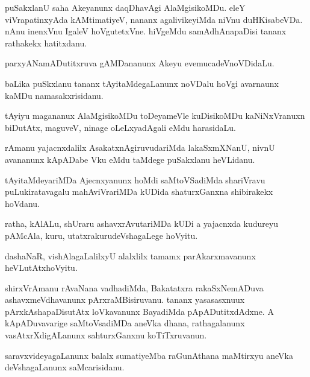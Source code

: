 \documentclass{article}
\begin{document}
\begin{mn}%
puSakxlanU saha Akeyanunx daqDhavAgi AlaMgisikoMDu. eleY viVrapatinxyAda kAMtimatiyeV, nananx
agalivikeyiMda niVnu duHKisabeVDa. nAnu inenxVnu IgaleV hoVgutetxVne. hiVgeMdu 
samAdhAnapaDisi tananx rathakekx hatitxdanu.
\end{mn}

\begin{mn}%
parxyANamADutitxruva gAMDananunx Akeyu evemucadeVnoVDidaLu.
\end{mn}

\begin{mn}%
baLika puSkxlanu tananx tAyitaMdegaLanunx noVDalu hoVgi avarnaunx kaMDu namasakxrisidanu.
\end{mn}

\begin{mn}%
tAyiyu magananux AlaMgisikoMDu toDeyameVle kuDisikoMDu kaNiNxVranuxn biDutAtx, maguveV, 
ninage oLeLxyadAgali eMdu harasidaLu.
\end{mn}

\begin{mn}%
rAmanu yajacnxdalilx AsakatxnAgiruvudariMda lakaSxmXNanU, nivnU avananunx kApADabe Vku 
eMdu taMdege puSakxlanu heVLidanu.
\end{mn}

\begin{mn}%
tAyitaMdeyariMDa Ajecnxyanunx hoMdi saMtoVSadiMda shariVravu puLukiratavagalu 
mahAviVrariMDa kUDida shaturxGanxna shibirakekx hoVdanu.
\end{mn}

\begin{mn}%
ratha, kAlALu, shUraru ashavxrAvutariMDa kUDi a yajacnxda kudureyu pAMcAla, kuru, 
utatxrakurudeVshagaLege hoVyitu.
\end{mn}

\begin{mn}%
dashaNaR, vishAlagaLalilxyU alalxlilx tamamx parAkarxmavanunx heVLutAtxhoVyitu.
\end{mn}

\begin{mn}%
shirxVrAmanu rAvaNana vadhadiMda, Bakatatxra rakaSxNemADuva ashavxmeVdhavanunx 
pArxraMBisiruvanu. tananx yasasasxnuux pArxkAshapaDisutAtx loVkavanunx BayadiMda 
pApADutitxdAdxne. A kApADuvavarige saMtoVsadiMDa aneVka dhana, rathagalanunx 
vasAtxrXdigALanunx sahturxGanxnu koTiTxruvanun.
\end{mn}

\begin{mn}%
saravxvideyagaLanunx balalx sumatiyeMba raGunAthana maMtirxyu aneVka deVshagaLanunx 
saMcarisidanu.
\end{mn}
\end{document}
